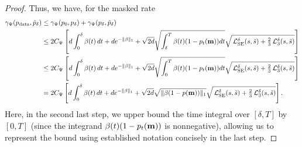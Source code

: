 \documentclass{article} %
\newcommand{\bfm}{{\bf m}}
\newcommand{\LSE}{\mathcal{L}_{\mathrm{SE}}}
\newcommand{\LThree}{\mathcal{L}_{3}}
\begin{document}
\begin{proof}
    Thus, we have, for the masked rate
    \begin{align*}
        \gamma_\Psi(p_\mathrm{data}, \tilde{p}_\delta) &\leq \gamma_\Psi(p_0, {p}_\delta) + \gamma_\Psi(p_\delta, \tilde{p}_\delta) \\
        &\leq 2 C_\Psi \left[ d\int_0^\delta \beta(t)\,dt + d e^{-\| \beta \|_1}   +   \sqrt{2 d} \sqrt{\int_\delta^T \beta(t) (1-p_t(\bfm)) dt} \sqrt{ \,\LSE^\delta (s, \tilde{s}) + \tfrac{2}{3}\,\LThree^\delta (s, \tilde{s}) } \right] \\
        &\leq 2 C_\Psi \left[ d\int_0^\delta \beta(t)\,dt + d e^{-\| \beta \|_1}   +   \sqrt{2 d} \sqrt{\int_0^T \beta(t) (1-p_t(\bfm)) dt} \sqrt{ \,\LSE^\delta (s, \tilde{s}) + \tfrac{2}{3}\,\LThree^\delta (s, \tilde{s}) } \right] \\
        &= 2 C_\Psi \left[ d\int_0^\delta \beta(t)\,dt + d e^{-\| \beta \|_1}   +   \sqrt{2 d} \sqrt{\| \beta (1-p(\bfm))\|_1 } \sqrt{ \,\LSE^\delta (s, \tilde{s}) + \tfrac{2}{3}\,\LThree^\delta (s, \tilde{s}) } \right].
    \end{align*}
    Here, in the second last step, we upper bound the time integral over $[\delta, T]$ by $[0, T]$ (since the integrand $\beta(t) (1-p_t(\bfm))$ is nonnegative), allowing us to represent the bound using established notation concisely in the last step. 


\end{proof}
\end{document}
